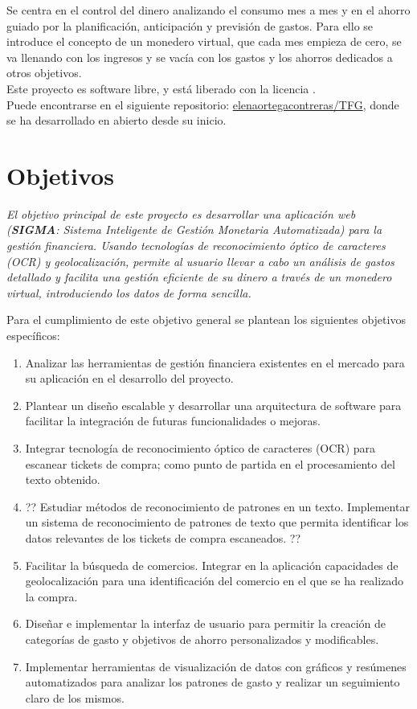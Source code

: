 Se centra en el control del dinero analizando el consumo mes a mes y en el 
ahorro guiado por la planificación, anticipación y previsión de gastos. Para ello 
se introduce el concepto de un monedero virtual, que cada mes empieza de cero, se va 
llenando con los ingresos y se vacía con los gastos y los ahorros dedicados a otros objetivos.\\

Este proyecto es software libre, y está liberado con la licencia \cite{gplv3}.\\
Puede encontrarse en el siguiente repositorio:
\href{https://github.com/elenaortegacontreras/TFG}{elenaortegacontreras/TFG}, 
donde se ha desarrollado en abierto desde su inicio.

\section{Objetivos} \label{sect:goals}
\textit{El objetivo principal de este proyecto es desarrollar una aplicación web (\textbf{SIGMA}: Sistema Inteligente de Gestión Monetaria Automatizada) 
para la gestión financiera. Usando tecnologías de reconocimiento
óptico de caracteres (OCR) y geolocalización, permite al usuario llevar a cabo un 
análisis de gastos detallado y facilita una gestión eficiente de su dinero
a través de un monedero virtual, introduciendo los datos de 
forma sencilla.}

Para el cumplimiento de este objetivo general se plantean los siguientes objetivos específicos:
\begin{enumerate}
    \item Analizar las herramientas  
        de gestión financiera existentes en el mercado para su aplicación en el desarrollo del proyecto.  
    \item Plantear un diseño escalable y desarrollar una arquitectura de software
    para facilitar la integración de futuras funcionalidades o mejoras. 
    \item Integrar tecnología de reconocimiento óptico de caracteres (OCR) para escanear tickets de compra; como punto de partida en el procesamiento del texto obtenido.
    \item ?? Estudiar métodos de reconocimiento de patrones en un texto. Implementar 
        un sistema de reconocimiento de patrones de texto que permita identificar 
        los datos relevantes de los tickets de compra escaneados. ??
    \item Facilitar la búsqueda de comercios. Integrar en la aplicación capacidades de geolocalización para una identificación del comercio en el que se ha realizado la compra.
    \item Diseñar e implementar la interfaz de usuario para permitir la creación 
         de categorías de gasto y objetivos de ahorro personalizados y modificables.
    \item Implementar herramientas de visualización de datos con gráficos y resúmenes automatizados para analizar los patrones de gasto y realizar un seguimiento claro de los mismos.
    
\end{enumerate}